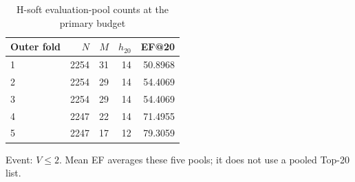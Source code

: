 \par
\begin{table}[H]
\centering
\begin{threeparttable}
\caption{H-soft evaluation-pool counts at the primary budget}\label{tab:folds}
\begin{tabular}{@{}lrrrr@{}}
\toprule
Outer fold & $N$ & $M$ & $h_{20}$ & EF@20\\
\midrule
1 & 2254 & 31 & 14 & 50.8968\\
2 & 2254 & 29 & 14 & 54.4069\\
3 & 2254 & 29 & 14 & 54.4069\\
4 & 2247 & 22 & 14 & 71.4955\\
5 & 2247 & 17 & 12 & 79.3059\\
\bottomrule
\end{tabular}
\begin{tablenotes}[flushleft]
\item[] Event: $V\le2$. Mean EF averages these five pools; it does not use a pooled Top-20 list.
\end{tablenotes}
\end{threeparttable}
\end{table}
\par
